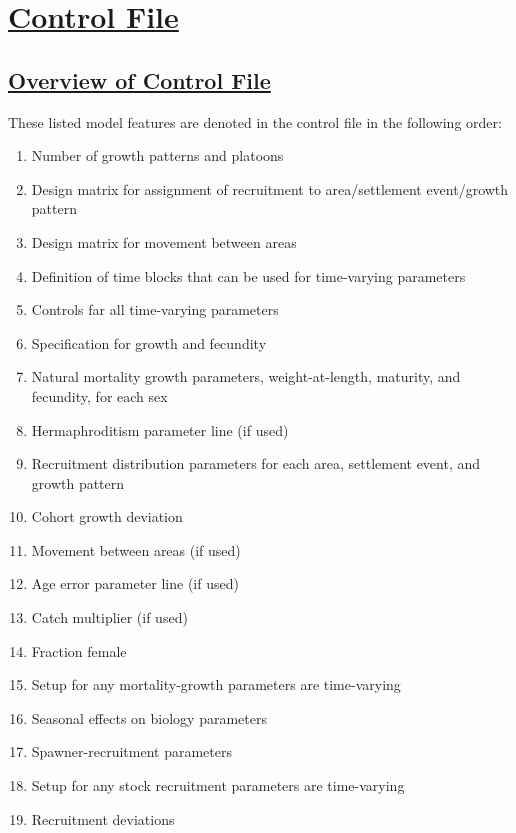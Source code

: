 \hypertarget{ControlFile}{}
\section[Control File]{\protect\hyperlink{ControlFile}{Control File}}
\hypertarget{OverviewControl}{}
\subsection[Overview of Control File]{\protect\hyperlink{OverviewControl}{Overview of Control File}}
These listed model features are denoted in the control file in the following order:
	\begin{enumerate}
		\item Number of growth patterns and platoons
		\item Design matrix for assignment of recruitment to area/settlement event/growth pattern
		\item Design matrix for movement between areas
		\item Definition of time blocks that can be used for time-varying parameters
		\item Controls far all time-varying parameters
		\\
		\item Specification for growth and fecundity
		\item Natural mortality growth parameters, weight-at-length, maturity, and fecundity, for each sex 
		\item Hermaphroditism parameter line (if used)
		\item Recruitment distribution parameters for each area, settlement event, and growth pattern
		\item Cohort growth deviation
		\item Movement between areas (if used)
		\item Age error parameter line (if used)
		\item Catch multiplier (if used)
		\item Fraction female 
		\item Setup for any mortality-growth parameters are time-varying
		\item Seasonal effects on biology parameters
		\\
		\item Spawner-recruitment parameters
		\item Setup for any stock recruitment parameters are time-varying
		\item Recruitment deviations
		\\

\end{enumerate}

